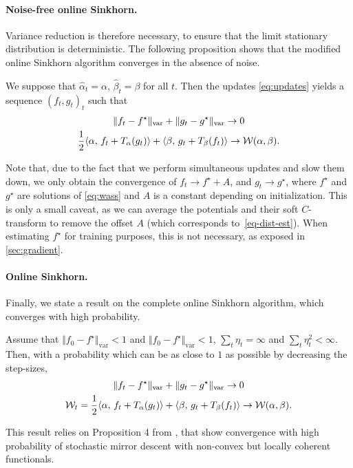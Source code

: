 \paragraph{Noise-free online Sinkhorn.}

Variance reduction is therefore necessary, to ensure that the limit stationary
distribution is deterministic. The following proposition shows that the modified online Sinkhorn algorithm converges in the absence of noise.

\begin{proposition}\label{eq:deterministic}
    We suppose that $\hat \alpha_t = \alpha$, $\hat \beta_t = \beta$ for all
    $t$. Then the updates \eqref{eq:updates} yields a sequence $(f_t, g_t)_t$ such
    that 
    \begin{gather}
        \Vert f_t - f^\star \Vert_{\text{var}} 
        + \Vert g_t - g^\star \Vert_{\text{var}} \to 0 \\
        \frac{1}{2} \langle \alpha,\,f_t + T_{\alpha}(g_t)\rangle + \langle \beta,\,g_t + T_{\beta}(f_t)\rangle 
         \to \mathcal{W}(\alpha, \beta).
    \end{gather}
\end{proposition}
Note that, due to the fact that we perform simultaneous updates and slow them
down, we only obtain the convergence of $f_t \to f^\star + A$, and $g_t \to
g^\star$, where $f^\star$ and $g^\star$ are solutions of \eqref{eq:wass} and $A$
is a constant depending on initialization. This is only a small caveat, as we
can average the potentials and their soft $C$-transform to remove the offset
$A$ (which corresponds to~\eqref{eq-dist-est}). When estimating $f^\star$ for training purposes, this is not necessary, as exposed in \autoref{sec:gradient}.

\paragraph{Online Sinkhorn.}

Finally, we state a result on the complete online Sinkhorn algorithm, which converges with high probability.
 
\begin{proposition}
    Assume that $\Vert f_0 - f^\star \Vert_{\text{var}} < 1$ and $\Vert f_0 -
    f^\star \Vert_{\text{var}} < 1$, $\sum_t \eta_t = \infty$ and $\sum_t
    \eta_t^2 < \infty$. Then, with a probability which can be as close to $1$
    as possible by decreasing the step-sizes,
    \begin{gather}
        \Vert f_t - f^\star \Vert_{\text{var}} + \Vert g_t - 
        g^\star \Vert_{\text{var}} \to 0 \\
        \mathcal{W}_t =\frac{1}{2} \langle \alpha,\,f_t + T_{\alpha}(g_t)\rangle + \langle \beta,\,g_t + T_{\beta}(f_t)\rangle 
        \to \mathcal{W}(\alpha, \beta).
    \end{gather}
\end{proposition}
% 
This result relies on Proposition 4 from \citet{zhou2017convergence}, that show convergence with
high probability of stochastic mirror descent with non-convex but locally coherent functionals.

